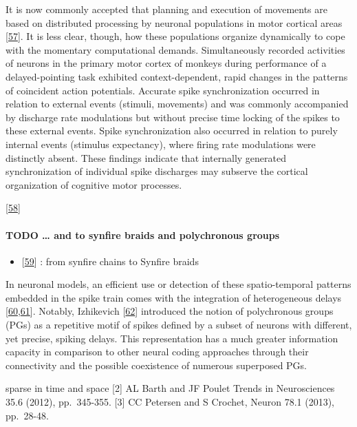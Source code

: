 It is now commonly accepted that planning and execution of movements are based on distributed processing by neuronal populations in motor cortical areas {[}\protect\hyperlink{ref-yLVM9IXi}{57}{]}. It is less clear, though, how these populations organize dynamically to cope with the momentary computational demands. Simultaneously recorded activities of neurons in the primary motor cortex of monkeys during performance of a delayed-pointing task exhibited context-dependent, rapid changes in the patterns of coincident action potentials. Accurate spike synchronization occurred in relation to external events (stimuli, movements) and was commonly accompanied by discharge rate modulations but without precise time locking of the spikes to these external events. Spike synchronization also occurred in relation to purely internal events (stimulus expectancy), where firing rate modulations were distinctly absent. These findings indicate that internally generated synchronization of individual spike discharges may subserve the cortical organization of cognitive motor processes.

{[}\protect\hyperlink{ref-OAorhMRa}{58}{]}

\hypertarget{todo-and-to-synfire-braids-and-polychronous-groups}{%
\paragraph{TODO \ldots{} and to synfire braids and polychronous groups}\label{todo-and-to-synfire-braids-and-polychronous-groups}}

\begin{itemize}
\tightlist
\item
  {[}\protect\hyperlink{ref-HjDb1gnq}{59}{]} : from synfire chains to Synfire braids
\end{itemize}

In neuronal models, an efficient use or detection of these spatio-temporal patterns embedded in the spike train comes with the integration of heterogeneous delays {[}\protect\hyperlink{ref-KS4oxnst}{60},\protect\hyperlink{ref-ga3ZTFC7}{61}{]}. Notably, Izhikevich {[}\protect\hyperlink{ref-SM9G0xBK}{62}{]} introduced the notion of polychronous groups (PGs) as a repetitive motif of spikes defined by a subset of neurons with different, yet precise, spiking delays. This representation has a much greater information capacity in comparison to other neural coding approaches through their connectivity and the possible coexistence of numerous superposed PGs.

sparse in time and space {[}2{]} AL Barth and JF Poulet Trends in Neurosciences 35.6 (2012), pp.~345-355. {[}3{]} CC Petersen and S Crochet, Neuron 78.1 (2013), pp.~28-48.

